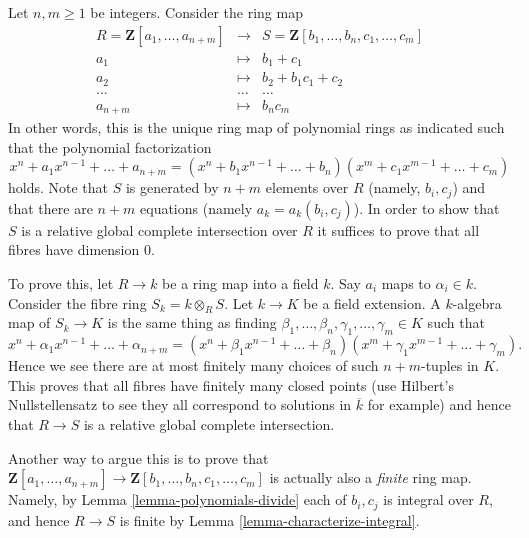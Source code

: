 \begin{example}
\label{example-factor-polynomials}
Let $n , m \geq 1$ be integers. Consider the ring map
\begin{eqnarray*}
R = \mathbf{Z}[a_1, \ldots, a_{n + m}]
& \longrightarrow &
S = \mathbf{Z}[b_1, \ldots, b_n, c_1, \ldots, c_m] \\
a_1 & \longmapsto & b_1 + c_1 \\
a_2 & \longmapsto & b_2 + b_1 c_1 + c_2 \\
\ldots & \ldots & \ldots \\
a_{n + m} & \longmapsto & b_n c_m
\end{eqnarray*}
In other words, this is the unique ring map of polynomial rings
as indicated such that the polynomial factorization
$$
x^n + a_1 x^{n - 1} + \ldots + a_{n + m}
=
(x^n + b_1 x^{n - 1} + \ldots + b_n)
(x^m + c_1 x^{m - 1} + \ldots + c_m)
$$
holds. Note that $S$ is generated by $n + m$ elements over $R$
(namely, $b_i, c_j$) and that there are $n + m$ equations
(namely $a_k = a_k(b_i, c_j)$). In order to show that
$S$ is a relative global complete intersection over $R$ it suffices
to prove that all fibres have dimension $0$.

\medskip\noindent
To prove this, let $R \to k$ be a
ring map into a field $k$. Say $a_i$ maps to $\alpha_i \in k$.
Consider the fibre ring $S_k = k \otimes_R S$. Let $k \to K$ be
a field extension. A $k$-algebra map of $S_k \to K$ is the same thing as
finding $\beta_1, \ldots, \beta_n, \gamma_1, \ldots, \gamma_m \in K$
such that
$$
x^n + \alpha_1 x^{n - 1} + \ldots + \alpha_{n + m}
=
(x^n + \beta_1 x^{n - 1} + \ldots + \beta_n)
(x^m + \gamma_1 x^{m - 1} + \ldots + \gamma_m).
$$
Hence we see there are at most finitely many choices of
such $n + m$-tuples in $K$. This proves that all fibres
have finitely many closed points (use Hilbert's Nullstellensatz
to see they all correspond to solutions in $\overline{k}$ for example)
and hence that $R \to S$ is a relative global complete intersection.

\medskip\noindent
Another way to argue this is to prove that
$\mathbf{Z}[a_1, \ldots, a_{n + m}] \to
\mathbf{Z}[b_1, \ldots, b_n, c_1, \ldots, c_m]$ is actually
also a {\it finite} ring map. Namely, by Lemma \ref{lemma-polynomials-divide}
each of $b_i, c_j$ is integral over $R$, and hence $R \to S$ is
finite by Lemma \ref{lemma-characterize-integral}.
\end{example}

